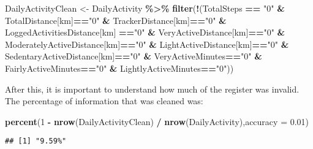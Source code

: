 \documentclass[
]{article}
\newenvironment{Shaded}{\begin{snugshade}}{\end{snugshade}}
\newcommand{\AttributeTok}[1]{\textcolor[rgb]{0.13,0.29,0.53}{#1}}
\newcommand{\DecValTok}[1]{\textcolor[rgb]{0.00,0.00,0.81}{#1}}
\newcommand{\FloatTok}[1]{\textcolor[rgb]{0.00,0.00,0.81}{#1}}
\newcommand{\FunctionTok}[1]{\textcolor[rgb]{0.13,0.29,0.53}{\textbf{#1}}}
\newcommand{\NormalTok}[1]{#1}
\newcommand{\OtherTok}[1]{\textcolor[rgb]{0.56,0.35,0.01}{#1}}
\newcommand{\SpecialCharTok}[1]{\textcolor[rgb]{0.81,0.36,0.00}{\textbf{#1}}}
\newcommand{\StringTok}[1]{\textcolor[rgb]{0.31,0.60,0.02}{#1}}
\begin{document}
\begin{Shaded}
\begin{Highlighting}[]
\NormalTok{DailyActivityClean }\OtherTok{\textless{}{-}}\NormalTok{ DailyActivity }\SpecialCharTok{\%\textgreater{}\%}
  \FunctionTok{filter}\NormalTok{(}\SpecialCharTok{!}\NormalTok{(TotalSteps }\SpecialCharTok{==} \StringTok{"0"} \SpecialCharTok{\&} \StringTok{\textasciigrave{}}\AttributeTok{TotalDistance[km]}\StringTok{\textasciigrave{}}\SpecialCharTok{==}\StringTok{"0"} \SpecialCharTok{\&} \StringTok{\textasciigrave{}}\AttributeTok{TrackerDistance[km]}\StringTok{\textasciigrave{}}\SpecialCharTok{==}\StringTok{"0"} \SpecialCharTok{\&} \StringTok{\textasciigrave{}}\AttributeTok{LoggedActivitiesDistance[km]}\StringTok{\textasciigrave{}} \SpecialCharTok{==}\StringTok{"0"} \SpecialCharTok{\&} \StringTok{\textasciigrave{}}\AttributeTok{VeryActiveDistance[km]}\StringTok{\textasciigrave{}}\SpecialCharTok{==}\StringTok{"0"} \SpecialCharTok{\&} \StringTok{\textasciigrave{}}\AttributeTok{ModeratelyActiveDistance[km]}\StringTok{\textasciigrave{}}\SpecialCharTok{==}\StringTok{"0"} \SpecialCharTok{\&} \StringTok{\textasciigrave{}}\AttributeTok{LightActiveDistance[km]}\StringTok{\textasciigrave{}}\SpecialCharTok{==}\StringTok{"0"} \SpecialCharTok{\&} \StringTok{\textasciigrave{}}\AttributeTok{SedentaryActiveDistance[km]}\StringTok{\textasciigrave{}}\SpecialCharTok{==}\StringTok{"0"} \SpecialCharTok{\&}\NormalTok{ VeryActiveMinutes}\SpecialCharTok{==}\StringTok{"0"} \SpecialCharTok{\&}\NormalTok{ FairlyActiveMinutes}\SpecialCharTok{==}\StringTok{"0"} \SpecialCharTok{\&}\NormalTok{ LightlyActiveMinutes}\SpecialCharTok{==}\StringTok{"0"}\NormalTok{))}
\end{Highlighting}
\end{Shaded}

After this, it is important to understand how much of the register was
invalid. The percentage of information that was cleaned was:

\begin{Shaded}
\begin{Highlighting}[]
\FunctionTok{percent}\NormalTok{(}\DecValTok{1} \SpecialCharTok{{-}} \FunctionTok{nrow}\NormalTok{(DailyActivityClean) }\SpecialCharTok{/} \FunctionTok{nrow}\NormalTok{(DailyActivity),}\AttributeTok{accuracy =} \FloatTok{0.01}\NormalTok{)}
\end{Highlighting}
\end{Shaded}

\begin{verbatim}
## [1] "9.59%"
\end{verbatim}
\end{document}
